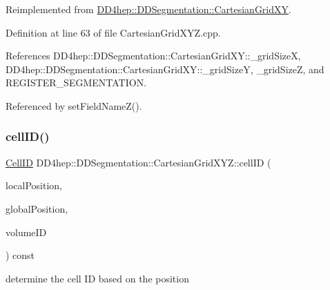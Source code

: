 Reimplemented from \hyperlink{class_d_d4hep_1_1_d_d_segmentation_1_1_cartesian_grid_x_y_a4e6684098e023a26f7f338190c394e0e}{D\+D4hep\+::\+D\+D\+Segmentation\+::\+Cartesian\+Grid\+XY}.



Definition at line 63 of file Cartesian\+Grid\+X\+Y\+Z.\+cpp.



References D\+D4hep\+::\+D\+D\+Segmentation\+::\+Cartesian\+Grid\+X\+Y\+::\+\_\+grid\+SizeX, D\+D4hep\+::\+D\+D\+Segmentation\+::\+Cartesian\+Grid\+X\+Y\+::\+\_\+grid\+SizeY, \+\_\+grid\+SizeZ, and R\+E\+G\+I\+S\+T\+E\+R\+\_\+\+S\+E\+G\+M\+E\+N\+T\+A\+T\+I\+ON.



Referenced by set\+Field\+Name\+Z().

\hypertarget{class_d_d4hep_1_1_d_d_segmentation_1_1_cartesian_grid_x_y_z_acc3af2f1d41a94cbb5bb965e8572096a}{}\label{class_d_d4hep_1_1_d_d_segmentation_1_1_cartesian_grid_x_y_z_acc3af2f1d41a94cbb5bb965e8572096a} 
\subsubsection{\texorpdfstring{cell\+I\+D()}{cellID()}}
{\footnotesize\ttfamily \hyperlink{namespace_d_d4hep_1_1_d_d_segmentation_ac7af071d85cb48820914434a07e21ba1}{Cell\+ID} D\+D4hep\+::\+D\+D\+Segmentation\+::\+Cartesian\+Grid\+X\+Y\+Z\+::cell\+ID (\begin{DoxyParamCaption}\item[{const \hyperlink{struct_d_d4hep_1_1_d_d_segmentation_1_1_vector3_d}{Vector3D} \&}]{local\+Position,  }\item[{const \hyperlink{struct_d_d4hep_1_1_d_d_segmentation_1_1_vector3_d}{Vector3D} \&}]{global\+Position,  }\item[{const \hyperlink{namespace_d_d4hep_1_1_d_d_segmentation_a61a6833a18d1800bdef176595f83e3ba}{Volume\+ID} \&}]{volume\+ID }\end{DoxyParamCaption}) const\hspace{0.3cm}{\ttfamily [virtual]}}



determine the cell ID based on the position 



